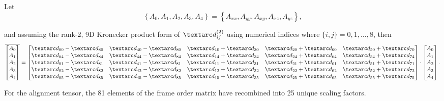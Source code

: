 Let
\begin{equation}
    \left\{ A_0, A_1, A_2, A_3, A_4 \right\} = \left\{ A_{xx}, A_{yy}, A_{xy}, A_{xz}, A_{yz} \right\} ,
\end{equation}

and assuming the rank-2, 9D Kronecker product form of $\FOtwo_{ij}$ using numerical indices where $\{i,j\} = 0, 1, \dots, 8$, then
\begin{equation}
    \overline{
        \begin{bmatrix}
            A_0 \\
            A_1 \\
            A_2 \\
            A_3 \\
            A_4
        \end{bmatrix}
    } =
        \begin{bmatrix}
            \FO_{00} - \FO_{80}  &  \FO_{40} - \FO_{80} &  \FO_{10} + \FO_{30} &  \FO_{20} + \FO_{60} &  \FO_{50} + \FO_{70} \\
            \FO_{04} - \FO_{84}  &  \FO_{44} - \FO_{84} &  \FO_{14} + \FO_{34} &  \FO_{24} + \FO_{64} &  \FO_{54} + \FO_{74} \\
            \FO_{01} - \FO_{81}  &  \FO_{41} - \FO_{81} &  \FO_{11} + \FO_{31} &  \FO_{21} + \FO_{61} &  \FO_{51} + \FO_{71} \\
            \FO_{02} - \FO_{82}  &  \FO_{42} - \FO_{82} &  \FO_{12} + \FO_{32} &  \FO_{22} + \FO_{62} &  \FO_{52} + \FO_{72} \\
            \FO_{05} - \FO_{85}  &  \FO_{45} - \FO_{85} &  \FO_{15} + \FO_{35} &  \FO_{25} + \FO_{65} &  \FO_{55} + \FO_{75}
        \end{bmatrix}
        \cdot
        \begin{bmatrix}
            A_0 \\
            A_1 \\
            A_2 \\
            A_3 \\
            A_4
        \end{bmatrix}
    .
\end{equation}

For the alignment tensor, the 81 elements of the frame order matrix have recombined into 25 unique scaling factors.




